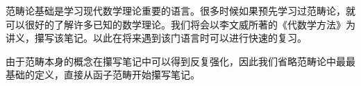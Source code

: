 \documentclass{package/fancy-book}
\begin{document}

\tableofcontents

\quad

范畴论基础是学习现代数学理论重要的语言。很多时候如果预先学习过范畴论，就可以很好的了解许多已知的数学理论。我们将会以李文威所著的《代数学方法》为讲义，攥写该笔记。以此在将来遇到该门语言时可以进行快速的复习。

由于范畴本身的概念在攥写笔记中可以得到反复强化，因此我们省略范畴论中最最基础的定义，直接从函子范畴开始攥写笔记。


\end{document}
